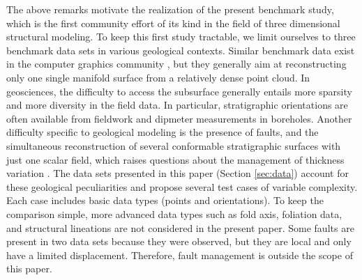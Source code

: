 \documentclass[preprint]{ring20}
\begin{document}
The above remarks motivate the realization of the present benchmark study, which is the first community effort of its kind in the field of three dimensional structural modeling. To keep this first study tractable, we limit ourselves to three benchmark data sets in various geological contexts. Similar benchmark data exist in the computer graphics community \citep[e.g.,][]{BLNTS13}, but they generally aim at reconstructing only one single manifold surface from a relatively dense point cloud. In geosciences, the difficulty to access the subsurface generally entails more sparsity and more diversity in the field data. In particular, stratigraphic orientations are often available from fieldwork and dipmeter measurements in boreholes. Another difficulty specific to geological modeling is the presence of faults, and the simultaneous reconstruction of several conformable stratigraphic surfaces with just one scalar field, which raises questions about the management of thickness variation \citep{Laurent2016MG}. The data sets presented in this paper (Section \ref{sec:data}) account for these geological peculiarities and propose several test cases of variable complexity. Each case includes basic data types (points and orientations). To keep the comparison simple, more advanced data types such as fold axis, foliation data, and structural lineations are not considered in the present paper. Some faults are present in two data sets because they were observed, but they are local and only have a limited displacement. Therefore, fault management is outside the scope of this paper. 
\end{document}
